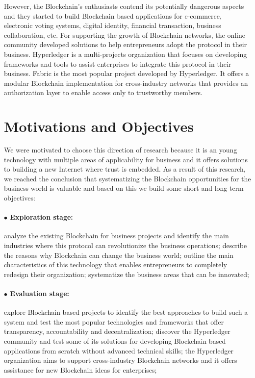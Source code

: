 However, the Blockchain's enthusiasts contend its potentially dangerous aspects and they started to build Blockchain based applications for e-commerce, electronic voting systems, digital identity, financial transaction, business collaboration, etc. For supporting the growth of Blockchain networks, the online community developed solutions to help entrepreneurs adopt the protocol in their business. 
Hyperledger is a multi-projects organization that focuses on developing frameworks and tools to assist enterprises to integrate this protocol in their business.
Fabric is the most popular project developed by Hyperledger. It offers a modular Blockchain implementation for cross-industry networks that provides an authorization layer to enable access only to trustworthy members. 


\section{Motivations and Objectives}
\label{sec:intro-section2}
We were motivated to choose this direction of research because it is an young technology with multiple areas of applicability for business and it offers solutions to building a new Internet where trust is embedded. As a result of this research, we reached the conclusion that systematizing the Blockchain opportunities for the business world is valuable and based on this we build some short and long term objectives:

\paragraph{$\bullet$ Exploration stage:} analyze the existing Blockchain for business projects and identify the main industries  where this protocol can revolutionize the business operations; describe the reasons why Blockchain can change the business world; outline the main characteristics of this technology that enables entrepreneurs to completely redesign their organization; systematize the business areas that can be innovated;
	
\paragraph{$\bullet$ Evaluation stage:} explore Blockchain based projects to identify the best approaches to build such a system and test the most popular technologies and frameworks that offer transparency, accountability and decentralization; discover the Hyperledger community and test some of its solutions for developing Blockchain based applications from scratch without advanced technical skills; the Hyperledger organization aims to support cross-industry Blockchain networks and it offers assistance for new Blockchain ideas for enterprises;
	

